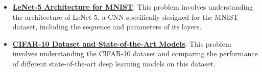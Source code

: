 \documentclass{article}%
\begin{document}
\begin{itemize}[leftmargin=*]
\item \href{https://purdue.brightspace.com/d2l/common/assets/pdfjs-d2l-dist/1.0.14-legacy/web/viewer.html?file=\%2Fcontent\%2Fenforced\%2F1095467-wl.202510.CS.24300.001\%2F09L1-cnn.pdf\%3Fou\%3D1095467\&lang=en-us\&container=d2l-fileviewer-rendered-pdf\&fullscreen=d2l-fileviewer-rendered-pdf-dialog\&height=667#page=22}{\textbf{LeNet-5 Architecture for MNIST}}: This problem involves understanding the architecture of LeNet-5, a CNN specifically designed for the MNIST dataset, including the sequence and parameters of its layers.%
\item \href{https://purdue.brightspace.com/d2l/common/assets/pdfjs-d2l-dist/1.0.14-legacy/web/viewer.html?file=\%2Fcontent\%2Fenforced\%2F1095467-wl.202510.CS.24300.001\%2F09L1-cnn.pdf\%3Fou\%3D1095467\&lang=en-us\&container=d2l-fileviewer-rendered-pdf\&fullscreen=d2l-fileviewer-rendered-pdf-dialog\&height=667#page=23}{\textbf{CIFAR-10 Dataset and State-of-the-Art Models}}: This problem involves understanding the CIFAR-10 dataset and comparing the performance of different state-of-the-art deep learning models on this dataset.%
\end{itemize}

%
\end{document}
